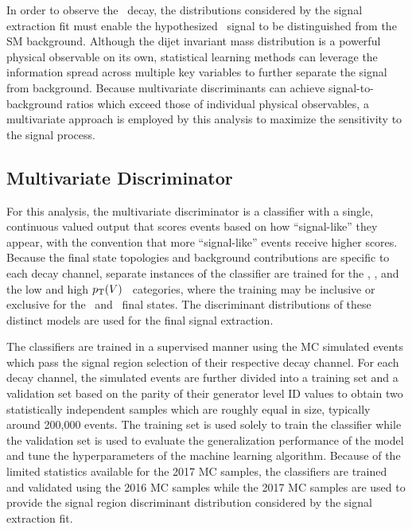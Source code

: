 In order to observe the \VHbb\ decay, the distributions considered by the signal extraction fit must enable the hypothesized \VHbb\ signal to be distinguished from the SM background. Although the dijet invariant mass distribution is a powerful physical observable on its own, statistical learning methods can leverage the information spread across multiple key variables to further separate the signal from background. Because multivariate discriminants can achieve signal-to-background ratios which exceed those of individual physical observables, a multivariate approach is employed by this analysis to maximize the sensitivity to the signal process.

\subsection{Multivariate Discriminator}

For this analysis, the multivariate discriminator is a classifier with a single, continuous valued output that scores events based on how ``signal-like'' they appear, with the convention that more ``signal-like'' events receive higher scores. Because the final state topologies and background contributions are specific to each decay channel, separate instances of the classifier are trained for the \ZnnH, \WlnH, and the low and high $p_{\mathrm{T}}(V)$ \ZllH\ categories, where the training may be inclusive or exclusive for the \lepe\ and \lepm\ final states. The discriminant distributions of these distinct models are used for the final signal extraction.

The classifiers are trained in a supervised manner using the MC simulated events which pass the signal region selection of their respective decay channel. For each decay channel, the simulated events are further divided into a training set and a validation set based on the parity of their generator level ID values to obtain two statistically independent samples which are roughly equal in size, typically around 200,000 events. The training set is used solely to train the classifier while the validation set is used to evaluate the generalization performance of the model and tune the hyperparameters of the machine learning algorithm. Because of the limited statistics available for the 2017 MC samples, the classifiers are trained and validated using the 2016 MC samples while the 2017 MC samples are used to provide the signal region discriminant distribution considered by the signal extraction fit.

